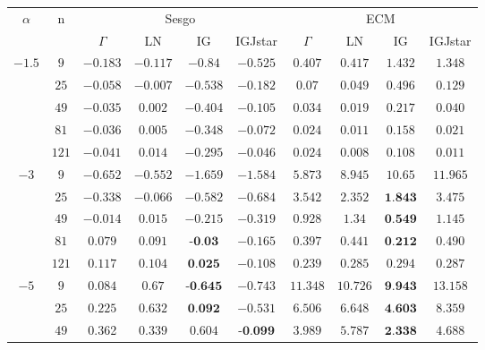 \begin{table}[hbt]										
	\centering									
	\small									
	\begin{tabular}{cc|cccc|cccc}									
		\toprule									
		\multirow{2 }{*}{$\alpha$} &\multirow{2 }{*}{ n  } & \multicolumn{4}{c|}{Sesgo} & \multicolumn{4}{c}{ECM}\\
		\cmidrule(r){3-6}
		\cmidrule(r){7-10}
		&  & $\Gamma$ & LN & IG & IGJstar & $\Gamma$  & LN & IG & IGJstar \\  
		\midrule				
		\multirow{5 }{*}{$-1.5$} 									
		& $9$	& $-0.183$	& $-0.117$  	& $-0.84$	& $-0.525$	& $0.407$	& $0.417$	& $1.432$ & $1.348$  \\ 
		& $25$ 	& $-0.058$	& $-0.007$	    & $-0.538$	& $-0.182$	& $0.07$	& $0.049$	& $0.496$ & $0.129$ \\ 
		& $49$	& $-0.035$	& $0.002$	    & $-0.404$	& $-0.105$	& $0.034$	& $0.019$	& $0.217$ & $0.040$ \\ 
		& $81$	& $-0.036$	& $0.005$	    & $-0.348$	& $-0.072$	& $0.024$	& $0.011$	& $0.158$ & $0.021$ \\ 
		& $121$	& $-0.041$	& $0.014$	    & $-0.295$	& $-0.046$	& $0.024$	& $0.008$	& $0.108$ & $0.011$ \\ 
		\cmidrule(r){1-6}
		\cmidrule(r){7-10}									
		\multirow{5 }{*}{$-3$}									
		& $9$   & $-0.652$    & $-0.552$	& $-1.659$				& $-1.584$	& $5.873$	& $8.945$	& $10.65$	 		 & $11.965$\\ 
		& $25$	& $-0.338$    & $-0.066$	& $-0.582$				& $-0.684$	& $3.542$	& $2.352$	& $\textbf{1.843}$	 & $3.475$ \\ 
		& $49$	& $-0.014$    & $0.015$  	& $-0.215$				& $-0.319$	& $0.928$	& $1.34$	& $\textbf{0.549}$	 & $1.145$ \\ 
		& $81$	& $0.079$	  & $0.091$	    & $\textbf{-0.03}$	    & $-0.165$	& $0.397$	& $0.441$	& $\textbf{0.212}$	 & $0.490$ \\ 
		& $121$	& $0.117$	  & $0.104$	    & $\textbf{0.025}$	    & $-0.108$	& $0.239$	& $0.285$	& $0.294$	 		 & $0.287$ \\ 
		\cmidrule(r){1-6}
		\cmidrule(r){7-10}									
		\multirow{5 }{*}{$-5$}									
		& $9$	& $0.084$	& $0.67$	& $\textbf{-0.645}$      & $-0.743$			    & $11.348$		& $10.726$  	& $\textbf{9.943}$	 & $13.158$ \\ 
		& $25$	& $0.225$	& $0.632$	& $\textbf{0.092}$	     & $-0.531$			    & $6.506$	    & $6.648$		& $\textbf{4.603}$	 & $8.359$ \\ 
		& $49$	& $0.36$2	& $0.339$	& $0.604$	 			 & $\textbf{-0.099}$	& $3.989$	    & $5.787$	    & $\textbf{2.338}$	 & $4.688$ \\ 

\end{tabular}
\end{table}
